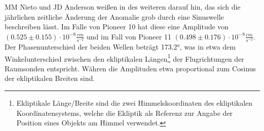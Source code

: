 MM Nieto und JD Anderson weißen in \cite{Nieto2005} des weiteren darauf hin, das sich die jährlichen zeitliche Änderung der Anomalie %
grob durch eine Sinuswelle beschreiben lässt. Im Falle von Pioneer 10 hat diese eine Amplitude von $(0.525\pm0.155)\cdot10^{-8}\frac{cm}{s^{-2}}$ und im Fall von Pioneer 11 $(0.498\pm0.176)\cdot10^{-8}\frac{cm}{s^{-2}}$. Der Phasenunterschied der beiden Wellen beträgt 173.2°, was in etwa dem Winkelunterschied zwischen den ekliptikalen Längen\footnote{Ekliptikale Länge/Breite sind die zwei Himmelskoordinaten des ekliptikalen Koordinatensystems, welche die Ekliptik als Referenz zur Angabe der Position eines Objekts am Himmel verwendet.} der Flugrichtungen der Raumsonden entspricht. Währen die Amplituden etwa proportional zum Cosinus der ekliptikalen Breiten sind.